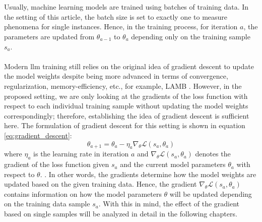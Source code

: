\\\\
Usually, machine learning models are trained using batches of training data. In the setting of this article, the batch size is set to exactly one to measure phenomena for single instances. Hence, in the training process, for iteration $a$, the parameters are updated from $\theta_{a-1}$ to $\theta_{a}$ depending only on the training sample $s_a$. 
\\\\
Modern \acrshort{llm} training still relies on the original idea of gradient descent to update the model weights despite being more advanced in terms of convergence, regularization, memory-efficiency, etc., for example, LAMB \cite{you2020largebatchoptimizationdeep}. However, in the proposed setting, we are only looking at the gradients of the loss function with respect to each individual training sample without updating the model weights correspondingly; therefore, establishing the idea of gradient descent is sufficient here. The formulation of gradient descent for this setting is shown in equation \ref{eq:gradient_descent}:
\begin{equation}
    \theta_{a+1} = \theta_a - \eta_a \nabla_{\theta} \mathcal{L}(s_a, \theta_a)
    \label{eq:gradient_descent}
\end{equation}
where $\eta_a$ is the learning rate in iteration $a$ and $\nabla_{\theta} \mathcal{L}(s_a, \theta_a)$ denotes the gradient of the loss function given $s_a$ and the current model parameters $\theta_a$ with respect to $\theta$. \cite{lin2024tokenwiseinfluentialtrainingdata}. In other words, the gradients determine how the model weights are updated based on the given training data. Hence, the gradient $\nabla_{\theta} \mathcal{L}(s_a, \theta_a)$ contains information on how the model parameters $\theta$ will be updated depending on the training data sample $s_a$. With this in mind, the effect of the gradient based on single samples will be analyzed in detail in the following chapters.

